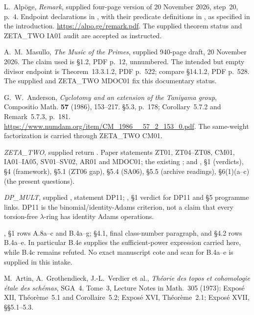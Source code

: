 L.~Alp\"oge, \emph{Remark}, supplied four-page version of
20 November 2026, step~20, p.~4.  Endpoint declarations in
, with their predicate definitions in
, as specified in the introduction.
\url{https://alpo.ge/remark.pdf}.  The supplied theorem status and
ZETA\_TWO IA01 audit are accepted as instructed.

A.~M.~Masullo, \emph{The Music of the Primes}, supplied 940-page
draft, 20 November 2026.  The claim used is \S1.2, PDF p.~12,
unnumbered.  The intended but empty divisor endpoint is
Theorem~13.3.1.2, PDF p.~522; compare \S14.1.2, PDF p.~528.
The supplied  and ZETA\_TWO
MDOC01 fix this documentary status.

G.~W.~Anderson, \emph{Cyclotomy and an extension of the Taniyama
group}, Compositio Math. \textbf{57} (1986), 153--217.
\S5.3, p.~178; Corollary~5.7.2 and Remark~5.7.3, p.~181.
\url{https://www.numdam.org/item/CM_1986__57_2_153_0.pdf}.
The same-weight factorization is carried through ZETA\_TWO CM01.

\emph{ZETA\_TWO}, supplied return
.
Paper statements ZT01, ZT04--ZT08, CM01, IA01--IA05,
SV01--SV02, AR01 and MDOC01; the existing
; and
,
\S1 (verdicts), \S4 (framework), \S5.1 (ZT06 gap),
\S5.4 (SA06), \S5.5 (archive readings), \S6(1)(a--c)
(the present questions).

\emph{DP\_MULT}, supplied
,
statement DP11; ,
\S1 verdict for DP11 and \S5 programme links.
DP11 is the binomial/identity-Adams criterion, not a claim that
every torsion-free $\lambda$-ring has identity Adams operations.

, \S1 rows
A.8a--c and B.4a--g; \S4.1, final class-number paragraph,
and \S4.2 rows B.4a--e.  In particular B.4e supplies the
sufficient-power expression carried here, while B.4c remains
refuted.  No exact manuscript cote and scan for B.4a--e
is supplied in this intake.

M.~Artin, A.~Grothendieck, J.-L.~Verdier et al.,
\emph{Th\'eorie des topos et cohomologie \'etale des sch\'emas},
SGA~4. Tome~3, Lecture Notes in Math.~305 (1973):
Expos\'e XII, Th\'eor\`eme~5.1 and Corollaire~5.2;
Expos\'e XVI, Th\'eor\`eme~2.1;
Expos\'e XVII, \S\S5.1--5.3.

